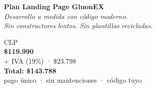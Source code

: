 \documentclass[11pt, a4paper]{article}
\begin{document}
  \begin{tcolorbox}
    [colback=lightblue, colframe=mainblue, arc=3mm, boxrule=1pt, left=8mm, right=8mm,
    top=5mm, bottom=5mm]
    \color{darkslate}
    \begin{minipage}[t]{0.6\textwidth}
      {\Large\bfseries Plan Landing Page GluonEX} \\[2mm] {\small\textit{Desarrollo a medida con código moderno.}}
      \\[1mm] {\small\textit{Sin constructores lentos. Sin plantillas recicladas.}}
    \end{minipage}
    \hfill
    \begin{minipage}[t]{0.4\textwidth}
      \begin{flushright}
        {\color{basicgray}\small CLP} \\ {\Huge\bfseries\color{darkslate}\$119.990}
        \\[1mm] {\small\color{basicgray}+ IVA (19\%) · \$23.798} \\ {\small\color{darkslate}\textbf{Total: \$143.788}}
        \\ {\footnotesize\color{warmgray}pago único · sin mantenciones · código tuyo}
      \end{flushright}
    \end{minipage}
  \end{tcolorbox}

  \vspace{4mm}
\end{document}
